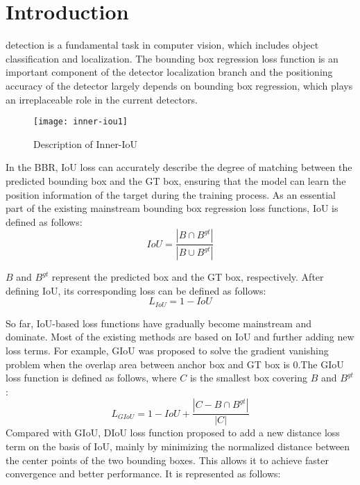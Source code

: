 \documentclass[lettersize,journal]{IEEEtran}
\begin{document}
	\section{Introduction}
	 detection is a fundamental task in computer vision, which includes object classification and localization. The bounding box regression loss function is an important component of the detector localization branch and the positioning accuracy of the detector largely depends on bounding box regression, which plays an irreplaceable role in  the current detectors. 
	\begin{figure}[!t]
		\centering
		\texttt{[image: inner-iou1]}
		\caption{Description of Inner-IoU }
		\label{fig_1} \end{figure}
	In the BBR, IoU loss\cite{ref1} can accurately describe the degree of matching between the predicted bounding box and the GT box, ensuring that the model can learn the position information of the target during the training process.
	As an essential part  of the existing mainstream bounding box regression loss functions, IoU is defined as follows:
	\begin{equation} 
		IoU=\displaystyle\frac{\left\vert B\cap B^{gt} \right\vert}{\left\vert B\cup B^{gt} \right\vert}
	\end{equation}
	\par $B$ and $B^{gt}$  represent the predicted box and the GT box, respectively. After defining IoU, its corresponding loss can be defined as follows:
	\begin{equation} 
		L_{IoU}=1-IoU 
	\end{equation}
	\par So far, IoU-based loss functions have gradually become mainstream and dominate. Most of the existing methods are based on IoU and further adding new loss terms. For example, GIoU\cite{ref2} was proposed to solve the gradient vanishing problem when the overlap area between anchor box and GT box is 0.The GIoU loss function\cite{ref2} is defined as follows, where $C$ is the smallest box covering $B$ and $B^{gt}$:  	
	\begin{equation} 
		L_{GIoU}=1-IoU+\displaystyle\frac{\left\vert C-B\cap B^{gt} \right\vert}{\left\vert C \right\vert}
	\end{equation} 
	Compared with GIoU, DIoU loss\cite{ref3} function proposed to add a new distance loss term on the basis of IoU, mainly by minimizing the normalized distance between the center points of the two bounding boxes. This allows it to achieve faster convergence and better performance. It is represented as follows:
\end{document}
